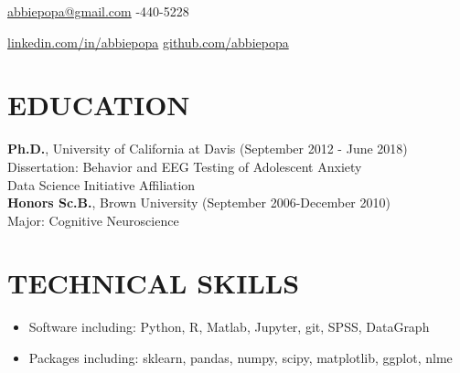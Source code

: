 \documentclass[line,margin,10pt]{res}
\begin{document}
 
\begin{resume}
\hoffset\centerline 
{\hyperref[abbiepopa@gmail.com]{abbiepopa@gmail.com} \quad \quad \quad \quad  \quad \quad \quad \quad \quad \quad \quad \quad \quad \quad \quad \quad \quad \quad \quad \quad \quad\quad \quad \quad \quad \quad \quad \quad \quad \quad \quad \quad  \quad \quad {}-440-5228}
\hoffset\centerline 
{\hspace{0.05cm} \hyperref[linkedin.com/in/abbiepopa]{linkedin.com/in/abbiepopa} \quad \quad \quad \quad \quad \quad \quad \quad \quad \quad \quad\quad \quad \quad \quad \quad \quad \quad \quad \quad \quad \quad  \quad \quad \quad  \quad \quad \quad   \quad \hyperref[github.com/abbiepopa]{github.com/abbiepopa}}
 
\section{EDUCATION} 
\textbf{Ph.D.}, University of California at Davis \hfill (September 2012 - June 2018)\\
Dissertation: Behavior and EEG Testing of Adolescent Anxiety\\
Data Science Initiative Affiliation\\
\textbf{Honors Sc.B.}, Brown University \hfill (September 2006-December 2010)\\
                Major: Cognitive Neuroscience

 \section{TECHNICAL SKILLS} 
 \begin{itemize}[leftmargin=-2pt] \itemsep -2pt
\item [] Software including: Python, R, Matlab, Jupyter, git, SPSS, DataGraph 
\item []Packages including: sklearn, pandas, numpy, scipy, matplotlib, ggplot, nlme
 \end{itemize}


\end{resume}
\end{document}
